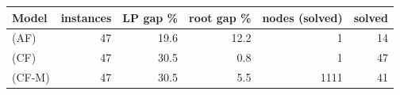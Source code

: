 \begin{tabular}{lrrrrr}
\toprule
Model & instances & LP gap \% & root gap \% & nodes (solved) & solved \\
\midrule
(AF) & 47 & 19.6 & 12.2 & 1 & 14 \\
(CF) & 47 & 30.5 & 0.8 & 1 & 47 \\
(CF-M) & 47 & 30.5 & 5.5 & 1111 & 41 \\
\bottomrule
\end{tabular}
